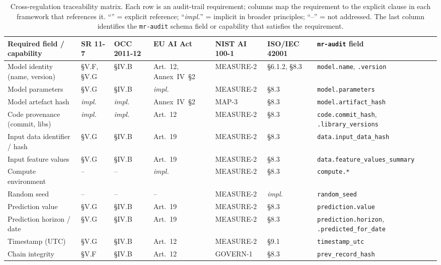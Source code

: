\begin{landscape}
\begin{table}
\centering
\caption{Cross-regulation traceability matrix. Each row is an audit-trail requirement; columns map the requirement to the explicit clause in each framework that references it. ``\checkmark'' = explicit reference; ``\textit{impl.}'' = implicit in broader principles; ``--'' = not addressed. The last column identifies the \texttt{mr-audit} schema field or capability that satisfies the requirement.}\label{tab:multi_regulation_matrix}
\footnotesize
\setlength{\tabcolsep}{5pt}
\begin{tabular}{@{}p{4.0cm}p{2.4cm}p{1.9cm}p{2.8cm}p{2.6cm}p{1.6cm}p{5.0cm}@{}}
\toprule
Required field / capability & SR 11-7 & OCC 2011-12 & EU AI Act & NIST AI 100-1 & ISO/IEC 42001 & \texttt{mr-audit} field \\
\midrule
Model identity (name, version) & §V.F, §V.G & §IV.B & Art.~12, Annex~IV~§2 & MEASURE-2 & §6.1.2, §8.3 & \texttt{model.name}, \texttt{.version} \\
Model parameters & §V.G & §IV.B & \textit{impl.} & MEASURE-2 & §8.3 & \texttt{model.parameters} \\
Model artefact hash & \textit{impl.} & \textit{impl.} & Annex~IV~§2 & MAP-3 & §8.3 & \texttt{model.artifact\_hash} \\
Code provenance (commit, libs) & \textit{impl.} & \textit{impl.} & Art.~12 & MEASURE-2 & §8.3 & \texttt{code.commit\_hash}, \texttt{.library\_versions} \\
Input data identifier / hash & §V.G & §IV.B & Art.~19 & MEASURE-2 & §8.3 & \texttt{data.input\_data\_hash} \\
Input feature values & §V.G & §IV.B & Art.~19 & MEASURE-2 & §8.3 & \texttt{data.feature\_values\_summary} \\
Compute environment & -- & -- & \textit{impl.} & MEASURE-2 & §8.3 & \texttt{compute.*} \\
Random seed & -- & -- & -- & MEASURE-2 & \textit{impl.} & \texttt{random\_seed} \\
Prediction value & §V.G & §IV.B & Art.~19 & MEASURE-2 & §8.3 & \texttt{prediction.value} \\
Prediction horizon / date & §V.G & §IV.B & Art.~19 & MEASURE-2 & §8.3 & \texttt{prediction.horizon}, \texttt{.predicted\_for\_date} \\
Timestamp (UTC) & §V.G & §IV.B & Art.~12 & MEASURE-2 & §9.1 & \texttt{timestamp\_utc} \\
Chain integrity & §V.F & §IV.B & Art.~12 & GOVERN-1 & §8.3 & \texttt{prev\_record\_hash} \\

\end{tabular}
\end{table}
\end{landscape}
